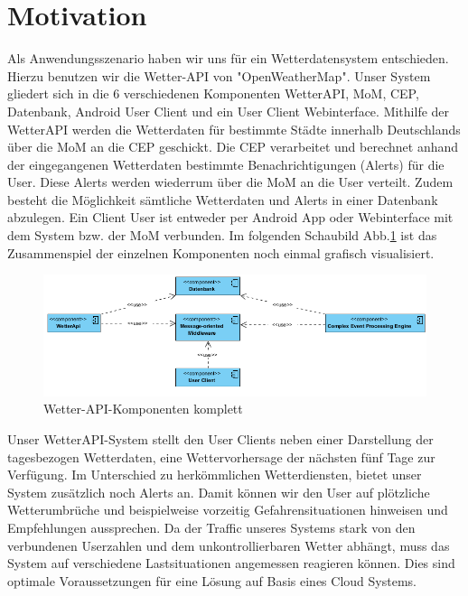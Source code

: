 \section{Motivation}

Als Anwendungsszenario haben wir uns für ein Wetterdatensystem entschieden. Hierzu benutzen wir die Wetter-API von "OpenWeatherMap". Unser System gliedert sich in die 6 verschiedenen Komponenten WetterAPI, MoM, CEP, Datenbank, Android  User Client und ein User Client Webinterface. Mithilfe der WetterAPI werden die Wetterdaten für bestimmte Städte innerhalb Deutschlands über die MoM an die CEP geschickt. Die CEP verarbeitet und berechnet anhand der eingegangenen Wetterdaten bestimmte Benachrichtigungen (Alerts) für die User. Diese Alerts werden wiederrum über die MoM an die User verteilt.  Zudem besteht die Möglichkeit sämtliche Wetterdaten und Alerts in einer Datenbank abzulegen. Ein Client User ist entweder per Android App oder Webinterface mit dem System bzw. der MoM verbunden.
Im folgenden Schaubild Abb.\ref{img:KomponentenKomplett} ist das Zusammenspiel der einzelnen Komponenten noch einmal grafisch visualisiert.

\begin{figure}[!ht]
	\centering
	\includegraphics[width=1.0\textwidth]{Bilder/alleKomponenten.PNG}
	\caption{Wetter-API-Komponenten komplett}
	\label{img:KomponentenKomplett}
\end{figure}

Unser WetterAPI-System stellt den User Clients neben einer Darstellung der tagesbezogen Wetterdaten, eine Wettervorhersage der nächsten fünf Tage zur Verfügung. Im Unterschied zu herkömmlichen Wetterdiensten, bietet unser System zusätzlich noch Alerts an. Damit  können wir den User auf plötzliche Wetterumbrüche und beispielweise vorzeitig Gefahrensituationen hinweisen und Empfehlungen aussprechen. 
Da der Traffic unseres Systems stark von den verbundenen Userzahlen und dem unkontrollierbaren Wetter abhängt, muss  das System auf verschiedene Lastsituationen angemessen reagieren können. Dies sind optimale Voraussetzungen für eine Lösung auf Basis eines Cloud Systems.




